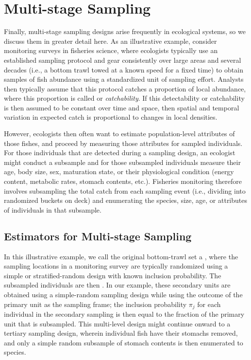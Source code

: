\section{Multi-stage Sampling}

Finally, multi-stage sampling designs arise frequently in ecological systems, so we discuss them in greater detail here.  As an illustrative example, consider monitoring surveys in fisheries science, where ecologists typically use an established sampling protocol and gear consistently over large areas and several decades (i.e., a bottom trawl towed at a known speed for a fixed time) to obtain samples of fish abundance using a standardized unit of sampling effort.  Analysts then typically assume that this protocol catches a proportion of local abundance, where this proportion is called  or \textit{catchability}.  If this detectability or catchability is then assumed to be constant over time and space, then spatial and temporal variation in expected catch is proportional to changes in local densities.

However, ecologists then often want to estimate population-level attributes of those fishes, and proceed by measuring those attributes for sampled individuals.  For those individuals that are detected during a sampling design, an ecologist might conduct a subsample and for those subsampled individuals measure their age, body size, sex, maturation state, or their physiological condition (energy content, metabolic rates, stomach contents, etc.).  Fisheries monitoring therefore involves subsampling the total catch from each sampling event (i.e., dividing into randomized buckets on deck) and enumerating the species, size, age, or attributes of individuals in that subsample.  

\subsection{Estimators for Multi-stage Sampling}

 In this illustrative example, we call the original bottom-trawl set a , where the sampling locations in a monitoring survey are typically randomized using a simple or stratified-random design with known inclusion probability.  The subsampled individuals are then .  In our example, these secondary units are obtained using a simple-random sampling design while using the outcome of the primary unit as the sampling frame; the inclusion probability \(\pi_j\) for each individual in the secondary sampling is then equal to the fraction of the primary unit that is subsampled.  This multi-level design might continue onward to a tertiary sampling design, wherein individual fish have their stomachs removed, and only a simple random subsample of stomach contents is then enumerated to species.

